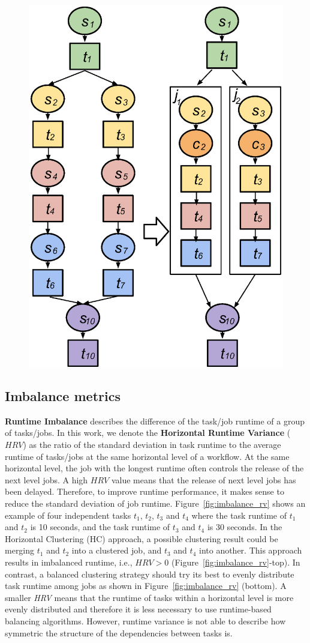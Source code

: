 \documentclass[final,5p,times,twocolumn]{elsarticle}
\begin{document}
\begin{figure}[!t]
\centering
 \includegraphics[width=0.55\linewidth]{figure4.eps}
  \label{fig:model_vc}
\end{figure}

\subsection{Imbalance metrics}

\textbf{Runtime Imbalance} describes the difference of the task/job runtime of a group of tasks/jobs. In this work, we denote the \textbf{Horizontal Runtime Variance} ($HRV$) as the ratio of the standard deviation in task runtime to the average runtime of tasks/jobs at the same horizontal level of a workflow. At the same horizontal level, the job with the longest runtime often controls the release of the next level jobs. A high $HRV$ value means that the release of next level jobs has been delayed. Therefore, to improve runtime performance, it makes sense to reduce the standard deviation of job runtime. Figure~\ref{fig:imbalance_rv} shows an example of four independent tasks $t_1$, $t_2$, $t_3$ and $t_4$ where the task runtime of $t_1$ and $t_2$ is 10 seconds, and the task runtime of $t_3$ and $t_4$ is 30 seconds. In the Horizontal Clustering (HC) approach, a possible clustering result could be merging $t_1$ and $t_2$ into a clustered job, and $t_3$ and $t_4$ into another. This approach results in imbalanced runtime, i.e., $HRV > 0$ (Figure~\ref{fig:imbalance_rv}-top). In contrast, a balanced clustering strategy should try its best to evenly distribute task runtime among jobs as shown in Figure~\ref{fig:imbalance_rv} (bottom). A smaller \emph{HRV} means that the runtime of tasks within a horizontal level is more evenly distributed and therefore it is less necessary to use runtime-based balancing algorithms. However, runtime variance is not able to describe how symmetric the structure of the dependencies between tasks is.
\end{document}
